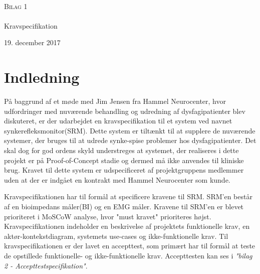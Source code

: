

\begin{titlingpage}
\begin{center}

~ \\[3cm]


\textsc{\LARGE Bilag 1}\\[1.5cm]


\noindent\makebox[\linewidth]{\rule{\textwidth}{0.4pt}}\\
[0.5cm]{\Huge Kravspecifikation}
\noindent\makebox[\linewidth]{\rule{\textwidth}{0.4pt}}
\end{center}
\vfill
\begin{center}
{\large 19. december 2017}
\end{center}
\end{titlingpage}

\newpage
\tableofcontents*


\chapter{Indledning}
På baggrund af et møde med Jim Jensen fra Hammel Neurocenter, hvor udfordringer med nuværende behandling og udredning af dysfagipatienter blev diskuteret, er der udarbejdet en kravspecifikation til et system ved navnet synkerefleksmonitor(SRM). Dette system er tiltænkt til at supplere de nuværende systemer, der bruges til at udrede synke-spise problemer hos dysfagipatienter. Det skal dog for god ordens skyld understreges at systemet, der realiseres i dette projekt er på Proof-of-Concept stadie og dermed må ikke anvendes til kliniske brug. Kravet til dette system er udspecificeret af projektgruppens medlemmer uden at der er indgået en kontrakt med Hammel Neurocenter som kunde. 

Kravspecifikationen har til formål at specificere
kravene til SRM. SRM'en består af en bioimpedans måler(BI) og en EMG måler. Kravene til SRM'en er blevet prioriteret i MoSCoW analyse, hvor "must kravet" prioriteres højst. Kravspecifikationen indeholder en beskrivelse af projektets funktionelle krav, en aktør-kontekstdiagram, systemets use-cases og ikke-funktionelle krav. Til  kravspecifikationen er der lavet en accepttest, som primært har til formål at teste
de opstillede funktionelle- og ikke-funktionelle krav. Accepttesten kan ses i \textit{"bilag 2 - Accepttestspecifikation"}.


